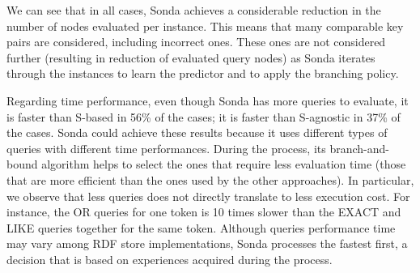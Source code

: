We can see that in all cases, Sonda achieves a considerable reduction in the number of nodes evaluated per instance. This means that many comparable key pairs are considered, including incorrect ones. These ones are not considered further (resulting in reduction of evaluated query nodes) as Sonda iterates through the instances to learn the predictor and to apply the branching policy. 

Regarding time performance, even though Sonda has more queries to evaluate, it is faster than S-based in 56\% of the cases; it is faster than S-agnostic in 37\% of the cases. Sonda could achieve these results because it uses different types of queries with different time performances. During the process, its branch-and-bound algorithm helps to select the ones that require less evaluation time (those that are more efficient than the ones used by the other approaches). In particular, we observe that less queries does not directly translate to less execution cost. For instance, the OR queries for one token is 10 times slower than the EXACT and LIKE queries together for the same token. Although queries performance time may vary among RDF store implementations, Sonda processes the fastest first, a decision that is based on experiences acquired during the process. 



 

 